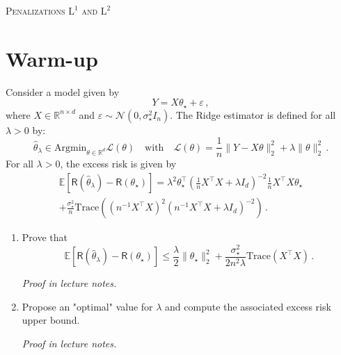 \documentclass[a4paper,10pt,fleqn]{article}
\newcommand{\eqsp}{\,}
\newcommand{\1}{\ensuremath{\mathbbm{1}}}
\newcommand{\bE}{\mathbb{E}}
\newcommand{\param}{\theta}
\begin{document}
\noindent\hrulefill

\begin{center}
\textsc{Penalizations $\mathrm{L}^1$ and $\mathrm{L}^2$}
\end{center}
\hrulefill

\medskip

\section{Warm-up}
Consider a model given by 
$$
Y = X\theta_\star + \varepsilon\,,
$$
where $X\in\mathbb{R}^{n\times d}$ and $\varepsilon \sim \mathcal{N}(0,\sigma_\star^2I_n)$. The Ridge estimator  is defined for all $\lambda>0$ by:
$$
\widehat{\theta}_{\lambda}\in\mathrm{Argmin}_{\theta\in\mathbb{R}^d} \mathcal{L}(\theta)\quad\mathrm{with} \quad \mathcal{L}(\theta) = \frac{1}{n} \|Y-X\theta\|_2^2 + \lambda \|\theta\|_2^2\,.
 $$
For all $\lambda>0$, the excess risk is given by
\begin{multline*}
\bE\left[\mathsf{R}(\widehat \param_\lambda) - \mathsf{R}(\param_\star)\right] = \lambda^2\param_\star^\top\left(\frac{1}{n}X^\top X + \lambda I_d\right)^{-2} \frac{1}{n}X^\top X \param_\star \\
+\frac{\sigma_\star^{2}}{n}\mathrm{Trace}\left((n^{-1}X^\top X)^2(n^{-1}X^\top X + \lambda I_d)^{-2}\right)\eqsp.
\end{multline*}

\begin{enumerate}
\item Prove that 
$$
\bE\left[\mathsf{R}(\widehat \param_\lambda) - \mathsf{R}(\param_\star)\right]  \leqslant \frac{\lambda}{2}\|\param_\star\|_2^2 + \frac{\sigma_\star^{2}}{2n^2\lambda}\mathrm{Trace}\left(X^\top X\right)\eqsp.
$$

\vspace{.2cm}

{\em
Proof in  lecture notes.
}

\item Propose an "optimal" value for $\lambda$ and  compute the associated excess risk upper bound.

\vspace{.2cm}

{\em
Proof in  lecture notes.
}
\end{enumerate}
\end{document}
